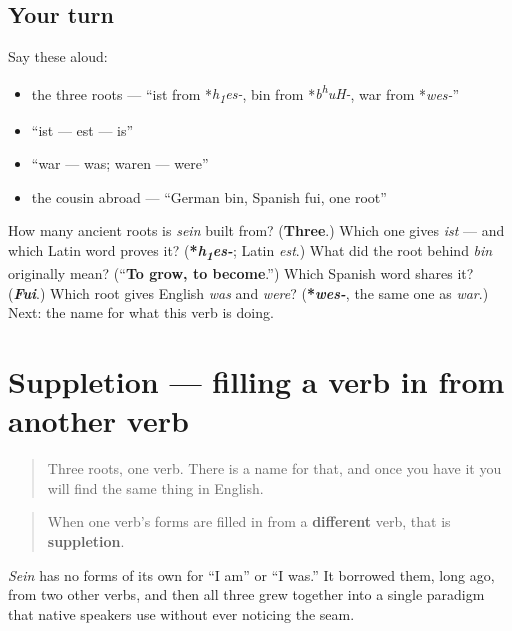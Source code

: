 \subsection*{Your turn}
Say these aloud:

\begin{itemize}
\raggedright
  \item the three roots — \textquotedblleft{}ist from *\emph{h\textsubscript{1}es-}, bin from *\emph{b\textsuperscript{h}uH-}, war from *\emph{wes-}\textquotedblright{}
  \item \textquotedblleft{}ist — est — is\textquotedblright{}
  \item \textquotedblleft{}war — was; waren — were\textquotedblright{}
  \item the cousin abroad — \textquotedblleft{}German bin, Spanish fui, one root\textquotedblright{}
\end{itemize}

\begin{tcolorbox}[breakable,colback=teal!4,colframe=teal!35!black,title={Before you move on}]
How many ancient roots is \emph{sein} built from? (\textbf{Three}.) Which one gives \emph{ist} — and which Latin word proves it? (\textbf{*\emph{h\textsubscript{1}es-}}; Latin \emph{est}.) What did the root behind \emph{bin} originally mean? (\textquotedblleft{}\textbf{To grow, to become}.\textquotedblright{}) Which Spanish word shares it? (\emph{\textbf{Fui}}.) Which root gives English \emph{was} and \emph{were}? (\textbf{*\emph{wes-}}, the same one as \emph{war}.) Next: the name for what this verb is doing.
\end{tcolorbox}
\section[Suppletion]{Suppletion — filling a verb in from another verb}

\label{lesson:GE-C16-suppletion}



\begin{quote}
Three roots, one verb. There is a name for that, and once you have it you will find the same thing in English.
\end{quote}

\begin{grammarlens}[title={Grammar Lens: what suppletion is}]
\begin{quote}
When one verb's forms are filled in from a \textbf{different} verb, that is \textbf{suppletion}.
\end{quote}

\emph{Sein} has no forms of its own for \textquotedblleft{}I am\textquotedblright{} or \textquotedblleft{}I was.\textquotedblright{} It borrowed them, long ago, from two other verbs, and then all three grew together into a single paradigm that native speakers use without ever noticing the seam.
\end{grammarlens}

